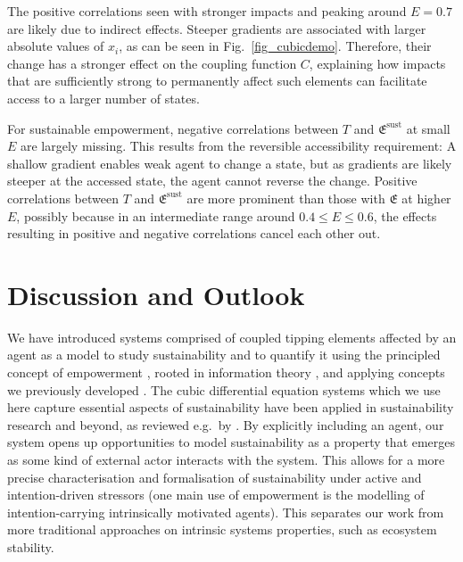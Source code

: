 \documentclass[conference]{IEEEtran}
\newcommand{\empowerment}{\ensuremath{\mathfrak{E}}}
\newcommand{\sustainableempowerment}{\ensuremath{\empowerment^{\mathrm{sust}}}}
\newcommand{\couplingfunction}{\ensuremath{C}}
\newcommand{\sumderivsquares}{\ensuremath{T}}
\newcommand{\impactstrength}{\ensuremath{E}}
\begin{document}
The positive correlations seen with stronger impacts and peaking
around $\impactstrength = 0.7$ are likely due to indirect effects. Steeper gradients
are associated with larger absolute values of $x_i$, as can be seen in
Fig.~\ref{fig_cubicdemo}. Therefore, their change has a stronger
effect on the coupling function $\couplingfunction$, explaining how
impacts that are sufficiently strong to permanently affect such
elements can facilitate access to a larger number of states.

For sustainable empowerment, negative correlations between
$\sumderivsquares$ and $\sustainableempowerment$ at small $\impactstrength$ are
largely missing. This results from the reversible accessibility
requirement: A shallow gradient enables weak agent to change a state,
but as gradients are likely steeper at the accessed state, the agent
cannot reverse the change. Positive correlations between
$\sumderivsquares$ and $\sustainableempowerment$ are more prominent
than those with $\empowerment$ at higher $\impactstrength$, possibly because in an
intermediate range around $0.4 \le \impactstrength \le 0.6$, the effects resulting
in positive and negative correlations cancel each other out.


\section{Discussion and Outlook}



We have introduced systems comprised of coupled tipping elements
affected by an agent as a model to study sustainability and to
quantify it using the principled concept of empowerment
\cite{Salge2014_empowermentintro}, rooted in information theory
\cite{CoverThomas1991_informationtheory}, and applying concepts we
previously developed \cite{Kim2009_sustainability}. The cubic
differential equation systems which we use here capture essential
aspects of sustainability have been applied in sustainability research
and beyond, as reviewed e.g.\ by
\cite{Klose2019_interactingtippingelements}. By explicitly including
an agent, our system opens up opportunities to model sustainability as
a property that emerges as some kind of external actor interacts with
the system. This allows for a more precise characterisation and
formalisation of sustainability under active and intention-driven
stressors (one main use of empowerment is the modelling of
intention-carrying intrinsically motivated agents). This separates our
work from more traditional approaches on intrinsic systems properties,
such as ecosystem stability.
\end{document}
